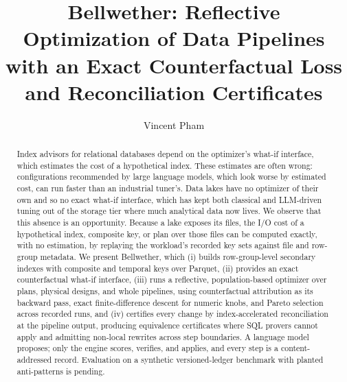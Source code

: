 \documentclass[sigconf,nonacm,balance=false,pbalance=true]{acmart}
\begin{document}
\title[Bellwether]{Bellwether: Reflective Optimization of Data Pipelines with
  an Exact Counterfactual Loss and Reconciliation Certificates}

\author{Vincent Pham}

\begin{abstract}
Index advisors for relational databases depend on the optimizer's what-if
interface, which estimates the cost of a hypothetical index. These estimates are
often wrong: configurations recommended by large language models, which look
worse by estimated cost, can run faster than an industrial tuner's. Data lakes
have no optimizer of their own and so no exact what-if interface, which has kept
both classical and LLM-driven tuning out of the storage tier where much
analytical data now lives. We observe that this absence is an opportunity.
Because a lake exposes its files, the I/O cost of a hypothetical index,
composite key, or plan over those files can be computed exactly, with no
estimation, by replaying the workload's recorded key sets against file and
row-group metadata. We present Bellwether, which (i) builds row-group-level
secondary indexes with composite and temporal keys over Parquet, (ii) provides
an exact counterfactual what-if interface, (iii) runs a reflective,
population-based optimizer over plans, physical designs, and whole pipelines,
using counterfactual attribution as its backward pass, exact finite-difference
descent for numeric knobs, and Pareto selection across recorded runs, and (iv)
certifies every change by index-accelerated reconciliation at the pipeline
output, producing equivalence certificates where SQL provers cannot apply and
admitting non-local rewrites across step boundaries. A language model proposes;
only the engine scores, verifies, and applies, and every step is a
content-addressed record. Evaluation on a synthetic versioned-ledger benchmark
with planted anti-patterns is pending.
\end{abstract}



\maketitle














\end{document}

